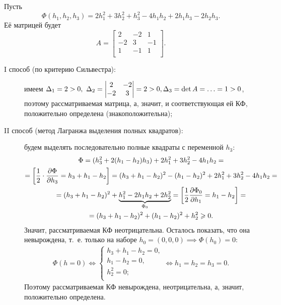 \documentclass[../../main.tex]{subfiles}
\begin{document}
	\begin{exmp}
		Пусть
		\[
			\Phi(h_1, h_2, h_3)
			= 2 h_1^2 + 3 h_2^2 + h_3^2 - 4 h_1 h_2 + 2 h_1 h_3 - 2 h_2 h_3.
		\]
		Её матрицей будет
		\[
			A =
			\begin{bmatrix}
				2 & -2 & 1 \\
				-2 & 3 & -1 \\
				1 & -1 & 1 \\
			\end{bmatrix}.
		\]
		\begin{description}
			\item[I способ (по критерию Сильвестра):]
			имеем $\Delta_1 = 2 > 0,\ \Delta_2 =
			\begin{vmatrix}
				2 & -2 \\
				-2 & 3 \\
			\end{vmatrix}
			= 2 > 0, \\
			\Delta_3 = \det A = \ldots = 1 > 0$,
			поэтому рассматриваемая матрица, а, значит, и соответствующая ей КФ,
			положительно определена (знакоположительна);
			
			\item[II способ (метод Лагранжа выделения полных квадратов):]
			будем выделять последовательно полные квадраты с переменной $h_3$:
			\begin{gather*}
				\Phi
				= (h_3^2 + 2(h_1 - h_2) h_3) + 2 h_1^2 + 3 h_2^2 - 4 h_1 h_2
				= \\ = \left[\dfrac{1}{2}\cdot \frac{\partial \Phi}{\partial h_3}
				= h_3 + h_1 - h_2\right]
				= (h_3 + h_1 - h_2)^2 - (h_1 - h_2)^2 + 2 h_1^2 + 3 h_2^2
				- 4 h_1 h_2
				= \\ = (h_3 + h_1 - h_2)^2 + \underbrace{h_1^2 - 2 h_1 h_2
				+ 2 h_2^2}_{\Phi_0}
				= \left[\dfrac{1}{2} \frac{\partial \Phi_0}{\partial h_1}
				= h_1 - h_2\right]
				= \\ = (h_3 + h_1 - h_2)^2 + (h_1 - h_2)^2 + h_2^2 \geqslant 0.
			\end{gather*}
			Значит, рассматриваемая КФ неотрицательна.
			Осталось показать, что она невырождена,
			т.~е. только на наборе $h_0 = (0, 0, 0) \implies
			\Phi(h_0) = 0$:
			\begin{gather*}
				\Phi(h = 0)
				\iff
				\begin{cases}
					h_3 + h_1 - h_2 = 0, \\
					h_1 - h_2 = 0, \\
					h_2^2 = 0; \\
				\end{cases}
				\iff
				h_1 = h_2 = h_3 = 0.
			\end{gather*}
			Поэтому рассматриваемая КФ невырождена, неотрицательна,
			а, значит, положительно определена.
		\end{description}
	\end{exmp}
	
\end{document}
